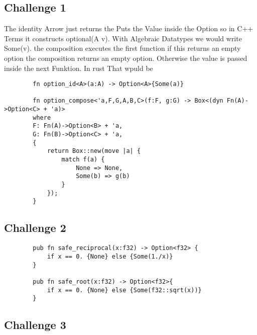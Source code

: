 \documentclass[11pt]{article}
\begin{document}
    \subsection*{Challenge 1}
    The identity Arrow just returns the Puts the Value inside the Option so in C++ Terms it constructs optional(A v). With Algebraic Datatypes we would write Some(v).
    the composition executes the first function if this returns an empty option the composition returns an empty option. Otherwise the value is passed inside the next Funktion. In rust That wpuld be 
    \begin{verbatim}
        fn option_id<A>(a:A) -> Option<A>{Some(a)}

        fn option_compose<'a,F,G,A,B,C>(f:F, g:G) -> Box<(dyn Fn(A)->Option<C> + 'a)>
        where
        F: Fn(A)->Option<B> + 'a,
        G: Fn(B)->Option<C> + 'a, 
        {
            return Box::new(move |a| {
                match f(a) {
                    None => None,
                    Some(b) => g(b)
                }
            });
        }
    \end{verbatim}
    \subsection*{Challenge 2}
    \begin{verbatim}
        pub fn safe_reciprocal(x:f32) -> Option<f32> {
            if x == 0. {None} else {Some(1./x)}
        }
        
        pub fn safe_root(x:f32) -> Option<f32>{
            if x == 0. {None} else {Some(f32::sqrt(x))}
        }
    \end{verbatim}
    \subsection*{Challenge 3}
    
\end{document}
